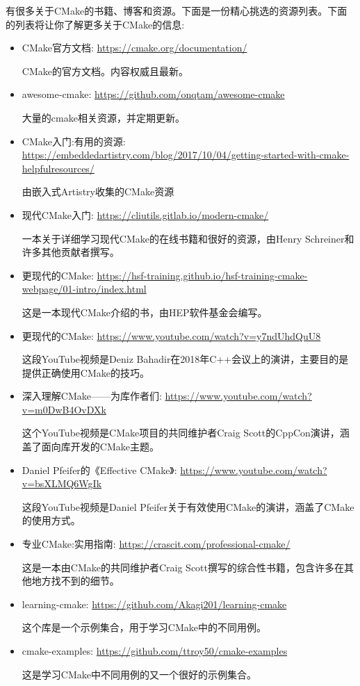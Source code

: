 有很多关于CMake的书籍、博客和资源。下面是一份精心挑选的资源列表。下面的列表将让你了解更多关于CMake的信息:

\begin{itemize}
\item 
CMake官方文档: \url{https://cmake.org/documentation/}

CMake的官方文档。内容权威且最新。
	
\item 
awesome-cmake: \url{https://github.com/onqtam/awesome-cmake}

大量的cmake相关资源，并定期更新。

\item 
CMake入门:有用的资源: \url{https://embeddedartistry.com/blog/2017/10/04/getting-started-with-cmake-helpfulresources/}

由嵌入式Artistry收集的CMake资源

\item 
现代CMake入门: \url{https://cliutils.gitlab.io/modern-cmake/}

一本关于详细学习现代CMake的在线书籍和很好的资源，由Henry Schreiner和许多其他贡献者撰写。

\item 
更现代的CMake: \url{https://hsf-training.github.io/hsf-training-cmake-webpage/01-intro/index.html}

这是一本现代CMake介绍的书，由HEP软件基金会编写。

\item 
更现代的CMake: \url{https://www.youtube.com/watch?v=y7ndUhdQuU8}

这段YouTube视频是Deniz Bahadir在2018年C++会议上的演讲，主要目的是提供正确使用CMake的技巧。

\item 
深入理解CMake——为库作者们: \url{https://www.youtube.com/watch?v=m0DwB4OvDXk}

这个YouTube视频是CMake项目的共同维护者Craig Scott的CppCon演讲，涵盖了面向库开发的CMake主题。

\item 
Daniel Pfeifer的《Effective CMake》: \url{https://www.youtube.com/watch?v=bsXLMQ6WgIk}

这段YouTube视频是Daniel Pfeifer关于有效使用CMake的演讲，涵盖了CMake的使用方式。

\item 
专业CMake:实用指南: \url{https://crascit.com/professional-cmake/}

这是一本由CMake的共同维护者Craig Scott撰写的综合性书籍，包含许多在其他地方找不到的细节。

\item 
learning-cmake: \url{https://github.com/Akagi201/learning-cmake}

这个库是一个示例集合，用于学习CMake中的不同用例。

\item 
cmake-examples: \url{https://github.com/ttroy50/cmake-examples}

这是学习CMake中不同用例的又一个很好的示例集合。
\end{itemize}

